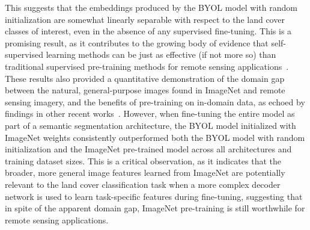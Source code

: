 This suggests that the embeddings produced by the BYOL model with random initialization are somewhat linearly separable with respect to the land cover classes of interest, even in the absence of any supervised fine-tuning.
This is a promising result, as it contributes to the growing body of evidence that self-supervised learning methods can be just as effective (if not more so) than traditional supervised pre-training methods for remote sensing applications~\citep{liGlobalLocalContrastive2022, bergSelfSupervisedLearningScene2022, taoSelfSupervisedRemoteSensing2023}.
These results also provided a quantitative demonstration of the domain gap between the natural, general-purpose images found in ImageNet and remote sensing imagery, and the benefits of pre-training on in-domain data, as echoed by findings in other recent works~\citep{neumannTrainingGeneralRepresentations2020}.
However, when fine-tuning the entire model as part of a semantic segmentation architecture, the BYOL model initialized with ImageNet weights consistently outperformed both the BYOL model with random initialization and the ImageNet pre-trained model across all architectures and training dataset sizes.
This is a critical observation, as it indicates that the broader, more general image features learned from ImageNet are potentially relevant to the land cover classification task when a more complex decoder network is used to learn task-specific features during fine-tuning, suggesting that in spite of the apparent domain gap, ImageNet pre-training is still worthwhile for remote sensing applications.

